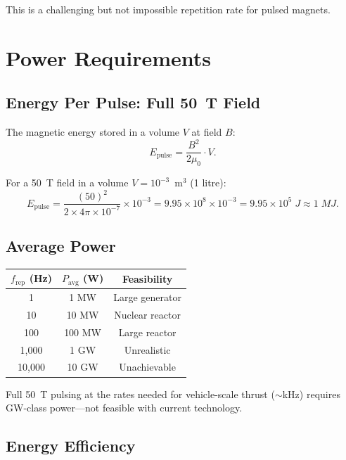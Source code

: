 \documentclass[amsmath,amssymb,aps,prd,superscriptaddress,nofootinbib]{revtex4-2}
\begin{document}
This is a challenging but not impossible repetition rate for pulsed
magnets.

\section{Power Requirements}\label{sec:power}

\subsection{Energy Per Pulse: Full 50~T Field}

The magnetic energy stored in a volume $V$ at field $B$:
\begin{equation}
E_\text{pulse} = \frac{B^2}{2\mu_0} \cdot V.
\end{equation}

For a 50~T field in a volume $V = 10^{-3}$~m$^3$ (1 litre):
\begin{equation}
E_\text{pulse} = \frac{(50)^2}{2 \times 4\pi \times 10^{-7}} \times 10^{-3}
= 9.95 \times 10^8 \times 10^{-3}
= 9.95 \times 10^5 \; \si{J}
\approx 1 \; \si{MJ}.
\end{equation}

\subsection{Average Power}

\begin{center}
\begin{tabular}{ccc}
\toprule
$f_\text{rep}$ (Hz) & $P_\text{avg}$ (W) & Feasibility \\
\midrule
1 & 1 MW & Large generator \\
10 & 10 MW & Nuclear reactor \\
100 & 100 MW & Large reactor \\
1{,}000 & 1 GW & Unrealistic \\
10{,}000 & 10 GW & Unachievable \\
\bottomrule
\end{tabular}
\end{center}

Full 50~T pulsing at the rates needed for vehicle-scale thrust
($\sim$kHz) requires GW-class power---not feasible with current
technology.

\subsection{Energy Efficiency}
\end{document}
